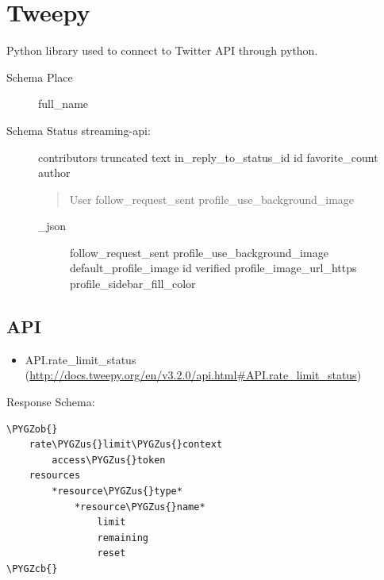 \documentclass[letterpaper,10pt,english]{sphinxmanual}
\def\PYGZus{\char`\_}
\def\PYGZob{\char`\{}
\def\PYGZcb{\char`\}}
\begin{document}
\section{Tweepy}
\label{twitter:tweepy}
Python library used to connect to Twitter API through python.
\begin{description}
\item[{Schema Place}] \leavevmode
full\_name

\item[{Schema Status streaming-api:}] \leavevmode
contributors
truncated
text
in\_reply\_to\_status\_id
id
favorite\_count
author
\begin{quote}

User
follow\_request\_sent
profile\_use\_background\_image
\end{quote}
\begin{description}
\item[{\_json}] \leavevmode
follow\_request\_sent
profile\_use\_background\_image
default\_profile\_image
id
verified
profile\_image\_url\_https
profile\_sidebar\_fill\_color

\end{description}

\end{description}


\subsection{API}
\label{twitter:id1}\begin{itemize}
\item {} 
API.rate\_limit\_status (\href{http://docs.tweepy.org/en/v3.2.0/api.html\#API.rate\_limit\_status}{http://docs.tweepy.org/en/v3.2.0/api.html\#API.rate\_limit\_status})

\end{itemize}

Response Schema:

\begin{Verbatim}[commandchars=\\\{\}]
\PYGZob{}
    rate\PYGZus{}limit\PYGZus{}context
        access\PYGZus{}token
    resources
        *resource\PYGZus{}type*
            *resource\PYGZus{}name*
                limit
                remaining
                reset
\PYGZcb{}
\end{Verbatim}
\end{document}
